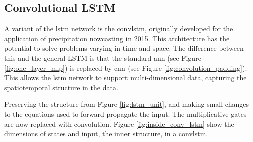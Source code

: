 \subsection{Convolutional LSTM}  \label{sec:convolutional_lstm}
A variant of the \acrshort{lstm} network is the \acrfull{convlstm}, originally developed for the application of precipitation nowcasting in 2015. This architecture has the potential to solve problems varying in time and space. The difference between this and the general LSTM is that the standard \acrshort{ann} (see Figure \ref{fig:one_layer_mlp}) is replaced by \acrshort{cnn} (see Figure \ref{fig:convolution_padding}). This allows the \acrshort{lstm} network to support multi-dimensional data, capturing the spatiotemporal structure in the data. 


Preserving the structure from Figure \ref{fig:lstm_unit}, and making small changes to the equations used to forward propagate the input. The multiplicative gates are now replaced with convolution. 
Figure \ref{fig:inside_conv_lstm} show the dimensions of states and input, the inner structure, in a \acrshort{convlstm}. 

